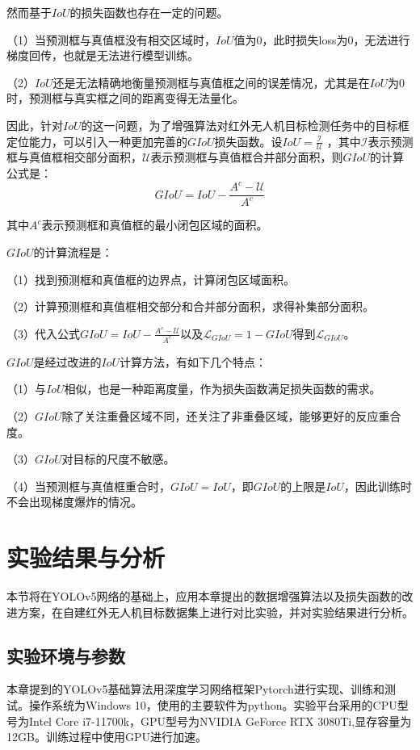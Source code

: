 然而基于$IoU$的损失函数也存在一定的问题。

（1）当预测框与真值框没有相交区域时，$IoU$值为0，此时损失loss为0，无法进行梯度回传，也就是无法进行模型训练。

（2）$IoU$还是无法精确地衡量预测框与真值框之间的误差情况，尤其是在$IoU$为0时，预测框与真实框之间的距离变得无法量化。

因此，针对$IoU$的这一问题，为了增强算法对红外无人机目标检测任务中的目标框定位能力，可以引入一种更加完善的$GIoU$损失函数。设$I o U=\frac{\mathcal{I}}{\mathcal{U}}$
，其中$\mathcal{I}$表示预测框与真值框相交部分面积，$\mathcal{U}$表示预测框与真值框合并部分面积，则$GIoU$的计算公式是：
\begin{equation}
  G I o U=I o U-\frac{A^{c}-\mathcal{U}}{A^{c}}
\end{equation}

其中$A^{c}$表示预测框和真值框的最小闭包区域的面积。

$GIoU$的计算流程是：

（1）找到预测框和真值框的边界点，计算闭包区域面积。

（2）计算预测框和真值框相交部分和合并部分面积，求得补集部分面积。

（3）代入公式$G I o U=I o U-\frac{A^{c}-\mathcal{U}}{A^{c}}$以及$\mathcal{L}_{G I o U}=1-G I o U$得到$\mathcal{L}_{G I o U}$。

$GIoU$是经过改进的$IoU$计算方法，有如下几个特点：

（1）与$IoU$相似，也是一种距离度量，作为损失函数满足损失函数的需求。

（2）$GIoU$除了关注重叠区域不同，还关注了非重叠区域，能够更好的反应重合度。

（3）$GIoU$对目标的尺度不敏感。

（4）当预测框与真值框重合时，$GIoU=IoU$，即$GIoU$的上限是$IoU$，因此训练时不会出现梯度爆炸的情况。

\section{实验结果与分析}
本节将在YOLOv5网络的基础上，应用本章提出的数据增强算法以及损失函数的改进方案，在自建红外无人机目标数据集上进行对比实验，并对实验结果进行分析。


\subsection{实验环境与参数}
本章提到的YOLOv5基础算法用深度学习网络框架Pytorch进行实现、训练和测试。操作系统为Windows 10，使用的主要软件为python。实验平台采用的CPU型号为Intel Core i7-11700k，GPU型号为NVIDIA GeForce RTX 3080Ti,显存容量为12GB。训练过程中使用GPU进行加速。

